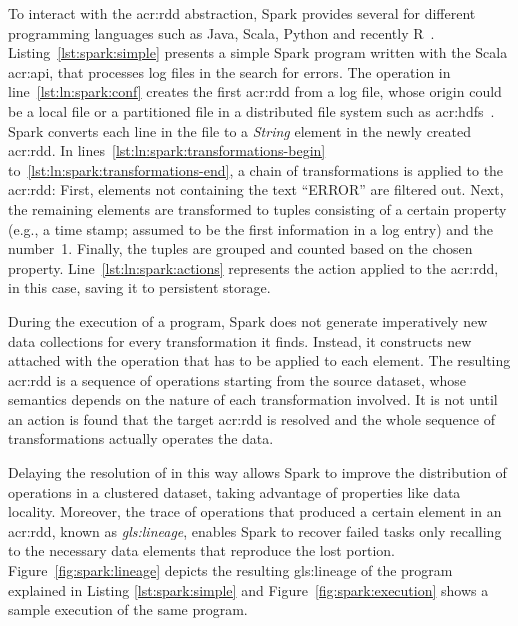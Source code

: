 To interact with the \acrshort{acr:rdd} abstraction, Spark provides several  for different programming languages such as Java, Scala, Python and recently R~\cite{Venkataraman2016}. Listing~\ref{lst:spark:simple} presents a simple Spark program written with the Scala \acrshort{acr:api}, that processes log files in the search for errors. The operation in line~\ref{lst:ln:spark:conf} creates the first \acrshort{acr:rdd} from a log file, whose origin could be a local file or a partitioned file in a distributed file system such as \acrfull{acr:hdfs}~\cite{WebHadoop2017}. Spark converts each line in the file to a \textit{String} element in the newly created \acrshort{acr:rdd}. In lines~\ref{lst:ln:spark:transformations-begin} to~\ref{lst:ln:spark:transformations-end}, a chain of transformations is applied to the \acrshort{acr:rdd}: First, elements not containing the text ``ERROR'' are filtered out. Next, the remaining elements are transformed to tuples consisting of a certain property (e.g., a time stamp; assumed to be the first information in a log entry) and the number~1. Finally, the tuples are grouped and counted based on the chosen property. Line~\ref{lst:ln:spark:actions} represents the action applied to the \acrshort{acr:rdd}, in this case, saving it to persistent storage.

During the execution of a program, Spark does not generate imperatively new data collections for every transformation it finds. Instead, it constructs new  attached with the operation that has to be applied to each element. The resulting \acrshort{acr:rdd} is a sequence of operations starting from the source dataset, whose semantics depends on the nature of each transformation involved. It is not until an action is found that the target \acrshort{acr:rdd} is resolved and the whole sequence of transformations actually operates the data. 

Delaying the resolution of  in this way allows Spark to improve the distribution of operations in a clustered dataset, taking advantage of properties like data locality. Moreover, the trace of operations that produced a certain element in an \acrshort{acr:rdd}, known as \textit{\gls{gls:lineage}}, enables Spark to recover failed tasks only recalling to the necessary data elements that reproduce the lost portion. Figure~\ref{fig:spark:lineage} depicts the resulting \gls{gls:lineage} of the program explained in Listing \ref{lst:spark:simple} and Figure~\ref{fig:spark:execution} shows a sample execution of the same program.

